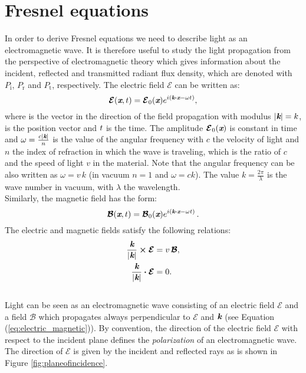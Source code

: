 \section{Fresnel equations}\label{sec:fresnel}
In order to derive Fresnel equations we need to describe light as an electromagnetic wave. 
It is therefore useful to study the light propagation from the perspective of electromagnetic theory which gives information about the incident, reflected and transmitted radiant flux density, which are denoted with $P_\textrm{i}$, $P_\textrm{r}$ and $P_\textrm{t}$, respectively.  
The electric field $\boldsymbol{\mathcal{E}}$ can be written as: 
\begin{equation}
\boldsymbol{\mathcal{E}}(\textit{\textbf{x}}, t) = \boldsymbol{\mathcal{E}}_0(\textit{\textbf{x}} )e^{i( \textit{\textbf{k}}\boldsymbol{\cdot}\textit{\textbf{x}}-\omega t)},
\end{equation}
where  is the vector in the direction of the field propagation with modulus 
$|\textit{\textbf{k}}| = k$,  is the position vector and $t$ is the time. The amplitude $\boldsymbol{\mathcal{E}}_0(\textit{\textbf{x}})$ is constant in time and $\omega = \frac{c |\textit{\textbf{k}}|}{n}$ is the value of the angular frequency with $c$ the velocity of light and $n$ the index of refraction in which the wave is traveling, which is the ratio of $c$ and the speed of light $v$ in the material. Note that the angular frequency can be also written as $\omega = v\, k$ (in vacuum $n=1$ and $\omega=ck$). The value
$k = \frac{2\pi}{\lambda}$ is the wave number in vacuum, with $\lambda$ the wavelength. \\ \indent Similarly, the magnetic field has the form:
\begin{equation}
\boldsymbol{\mathcal{B}}(\textit{\textbf{x}}, t) = \boldsymbol{\mathcal{B}}_0(\textit{\textbf{x}}) e^{i( \textit{\textbf{k}}\boldsymbol{\cdot} \textit{\textbf{x}}-\omega t )}\,.
\end{equation}
The electric and magnetic fields satisfy the following relations:
\begin{subequations}
\begin{align}
\frac{\textit{\textbf{k}}}{|\textit{\textbf{k}}|} \boldsymbol{\times} \boldsymbol{\mathcal{E}} & = v \, \boldsymbol{\mathcal{B}}, \label{eq:electric_magnetic}\\
\frac{\textit{\textbf{k}}}{|\textit{\textbf{k}}|} \boldsymbol{\cdot}\boldsymbol{\mathcal{E}} &=0.
\end{align}
\end{subequations}
\\ \indent Light can be seen as an electromagnetic wave consisting of an electric field $\boldsymbol{\mathcal{E}}$ and a field $\boldsymbol{\mathcal{B}}$ which propagates always perpendicular to $\boldsymbol{\mathcal{E}}$ and $\textit{\textbf{k}}$ (see Equation (\ref{eq:electric_magnetic})). By convention, the direction of the electric field $\boldsymbol{\mathcal{E}}$ \cite{feynman1964feynman} with respect to the incident plane defines the \textit{polarization} of an electromagnetic wave. The direction of $\boldsymbol{\mathcal{E}}$ is given by the incident and reflected rays as is shown in Figure \ref{fig:planeofincidence}. \\

